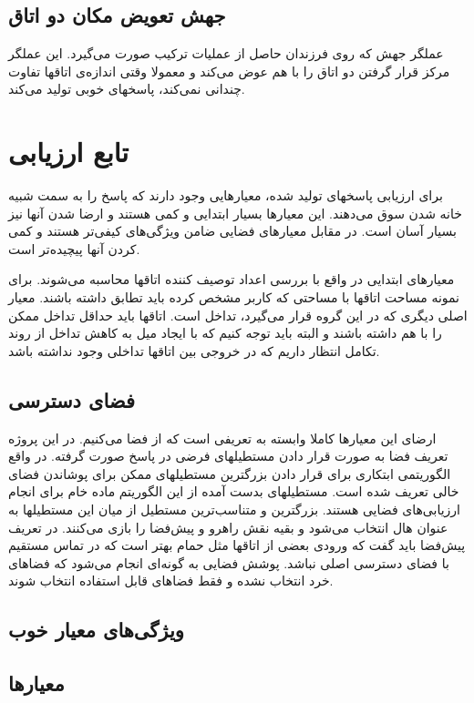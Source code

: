 \documentclass{report}
\begin{document}
\subsection{جهش تعویض مکان دو اتاق}
عملگر جهش که روی فرزندان حاصل از عملیات ترکیب صورت می‌گیرد. این عملگر مرکز قرار گرفتن دو اتاق را با هم عوض می‌کند و معمولا وقتی اندازه‌ی اتاقها تفاوت چندانی نمی‌کند، پاسخهای خوبی تولید می‌کند.

\section{تابع ارزیابی}
برای ارزیابی پاسخهای تولید شده، معیارهایی وجود دارند که پاسخ را به سمت شبیه خانه شدن سوق می‌دهند. این معیارها بسیار ابتدایی و کمی هستند و ارضا شدن آنها نیز بسیار آسان است. در مقابل معیارهای فضایی ضامن ویژگی‌های کیفی‌تر هستند و کمی کردن آنها پیچیده‌تر است.

معیارهای ابتدایی در واقع با بررسی اعداد توصیف کننده اتاقها محاسبه می‌شوند. برای نمونه مساحت اتاقها با مساحتی که کاربر مشخص کرده باید تطابق داشته باشند. معیار اصلی دیگری که در این گروه قرار می‌گیرد، تداخل است. اتاقها باید حداقل تداخل ممکن را با هم داشته باشند و البته باید توجه کنیم که با ایجاد میل به کاهش تداخل از روند تکامل انتظار داریم که در خروجی بین اتاقها تداخلی وجود نداشته باشد.

\subsection{فضای دسترسی}
ارضای این معیارها کاملا وابسته به تعریفی است که از فضا می‌کنیم. در این پروژه تعریف فضا به صورت قرار دادن مستطیلهای فرضی در پاسخ صورت گرفته. در واقع الگوریتمی ابتکاری برای قرار دادن بزرگترین مستطیلهای ممکن برای پوشاندن فضای خالی تعریف شده است. مستطیلهای بدست آمده از این الگوریتم ماده خام برای انجام ارزیابی‌های فضایی هستند. بزرگترین و متناسب‌ترین مستطیل از میان این مستطیلها به عنوان هال انتخاب می‌شود و بقیه نقش راهرو و پیش‌فضا را بازی می‌کنند. در تعریف پیش‌فضا باید گفت که ورودی بعضی از اتاقها مثل حمام بهتر است که در تماس مستقیم با فضای دسترسی اصلی نباشد. پوشش فضایی به گونه‌ای انجام می‌شود که فضاهای خرد انتخاب نشده و فقط فضاهای قابل استفاده انتخاب شوند. 

\subsection{ویژگی‌های معیار خوب}


\subsection{معیارها}
\end{document}
